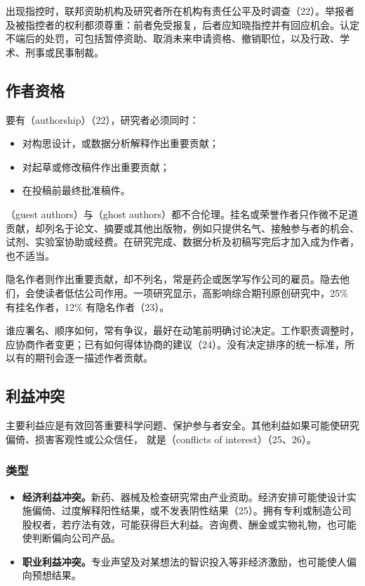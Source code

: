出现指控时，联邦资助机构及研究者所在机构有责任公平及时调查（22）。举报者及被指控者的权利都须尊重：前者免受报复，后者应知晓指控并有回应机会。认定不端后的处罚，可包括暂停资助、取消未来申请资格、撤销职位，以及行政、学术、刑事或民事制裁。

\subsection{作者资格}
要有（authorship）（22），研究者必须同时：
\begin{itemize}
\item 对构思设计，或数据分析解释作出重要贡献；
\item 对起草或修改稿件作出重要贡献；
\item 在投稿前最终批准稿件。
\end{itemize}
（guest authors）与（ghost authors）都不合伦理。挂名或荣誉作者只作微不足道贡献，却列名于论文、摘要或其他出版物，例如只提供名气、接触参与者的机会、试剂、实验室协助或经费。在研究完成、数据分析及初稿写完后才加入成为作者，也不适当。

隐名作者则作出重要贡献，却不列名，常是药企或医学写作公司的雇员。隐去他们，会使读者低估公司作用。一项研究显示，高影响综合期刊原创研究中，25\% 有挂名作者，12\% 有隐名作者（23）。

谁应署名、顺序如何，常有争议，最好在动笔前明确讨论决定。工作职责调整时，应协商作者变更；已有如何得体协商的建议（24）。没有决定排序的统一标准，所以有的期刊会逐一描述作者贡献。

\subsection{利益冲突}
主要利益应是有效回答重要科学问题、保护参与者安全。其他利益如果可能使研究偏倚、损害客观性或公众信任，
就是（conflicts of interest）（25、26）。
\subsubsection{类型}
\begin{itemize}
\item \textbf{经济利益冲突。}新药、器械及检查研究常由产业资助。经济安排可能使设计实施偏倚、过度解释阳性结果，或不发表阴性结果（25）。拥有专利或制造公司股权者，若疗法有效，可能获得巨大利益。咨询费、酬金或实物礼物，也可能使判断偏向公司产品。
\item \textbf{职业利益冲突。}专业声望及对某想法的智识投入等非经济激励，也可能使人偏向预想结果。
\end{itemize}

